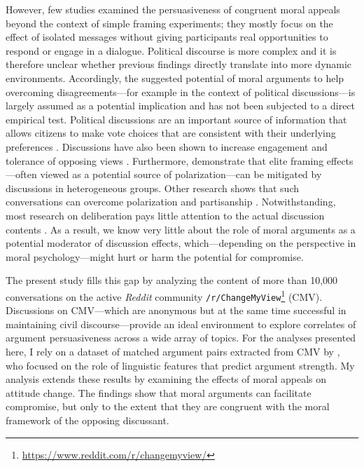 However, few studies examined the persuasiveness of congruent moral appeals beyond the context of simple framing experiments; they mostly focus on the effect of isolated messages without giving participants real opportunities to respond or engage in a dialogue. Political discourse is more complex and it is therefore unclear whether previous findings directly translate into more dynamic environments. Accordingly, the suggested potential of moral arguments to help overcoming disagreements---for example in the context of political discussions---is largely assumed as a potential implication and has not been subjected to a direct empirical test. Political discussions are an important source of information \citep{huckfeldt1995political,schmitt2020living} that allows citizens to make vote choices that are consistent with their underlying preferences \citep{kraft2013helfen,schmitt2014political}. Discussions have also been shown to increase engagement and tolerance of opposing views \citep{mutz2002cross}. Furthermore, \citet{druckman2003framing} demonstrate that elite framing effects---often viewed as a potential source of polarization---can be mitigated by discussions in heterogeneous groups. Other research shows that such conversations can overcome polarization and partisanship \citep{klar2014partisanship}. Notwithstanding, most research on deliberation pays little attention to the actual discussion contents \citep[see][for notable exceptions]{barabas2004deliberation,karpowitz2012gender,mendelberg2014gender}. As a result, we know very little about the role of moral arguments as a potential moderator of discussion effects, which---depending on the perspective in moral psychology---might hurt or harm the potential for compromise. 

The present study fills this gap by analyzing the content of more than 10,000 conversations on the active \textit{Reddit} community \texttt{/r/ChangeMyView}\footnote{\url{https://www.reddit.com/r/changemyview/}} (CMV). Discussions on CMV---which are anonymous but at the same time successful in maintaining civil discourse---provide an ideal environment to explore correlates of argument persuasiveness across a wide array of topics. For the analyses presented here, I rely on a dataset of matched argument pairs extracted from CMV by \citet{tan2016winning}, who focused on the role of linguistic features that predict argument strength. My analysis extends these results by examining the effects of moral appeals on attitude change. The findings show that moral arguments can facilitate compromise, but only to the extent that they are congruent with the moral framework of the opposing discussant.

